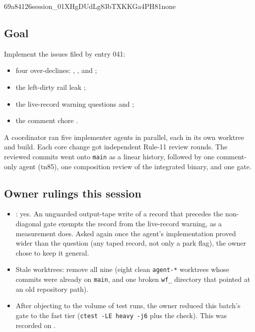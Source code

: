 %
  {69a84126}{session\_01XHgDUdLg83bTXKKGa4PH81}{none}

\subsection*{Goal}
Implement the issues filed by entry 041:
\begin{itemize}
  \item four over-declines: , ,
   and ;
  \item the left-dirty rail leak ;
  \item the live-record warning questions  and
  ;
  \item the comment chore .
\end{itemize}
A coordinator ran five implementer agents in parallel, each in its own worktree and build.
Each core change got independent Rule-11 review rounds. The reviewed commits went onto
\texttt{main} as a linear history, followed by one comment-only agent (tn85), one composition
review of the integrated binary, and one gate.

\subsection*{Owner rulings this session}
\begin{itemize}
  \item {}: yes. An unguarded output-tape write of a record that
  precedes the non-diagonal gate exempts the record from the live-record warning, as a
  measurement does. Asked again once the agent's implementation proved wider than the
  question (any taped record, not only a park flag), the owner chose to keep it general.
  \item Stale worktrees: remove all nine (eight clean \texttt{agent-*} worktrees whose
  commits were already on \texttt{main}, and one broken \texttt{wf\_} directory that pointed
  at an old repository path).
  \item After objecting to the volume of test runs, the owner reduced this batch's gate to
  the fast tier (\texttt{ctest -LE heavy -j6} plus the  check). This
  was recorded on .
\end{itemize}

